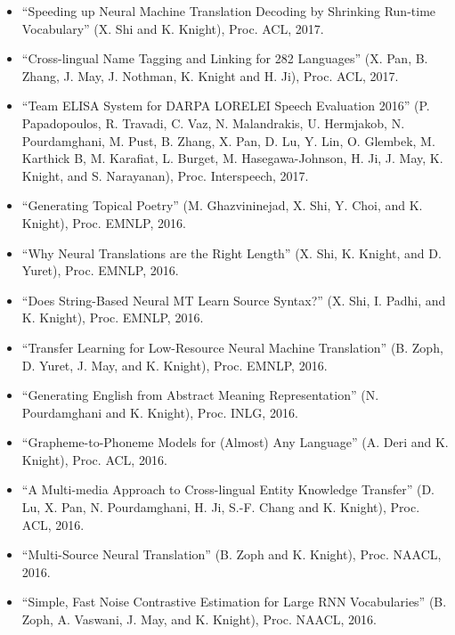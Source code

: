 \begin{itemize}
\item ``Speeding up Neural Machine Translation Decoding by Shrinking Run-time Vocabulary'' (X. Shi and K. Knight), Proc. ACL, 2017. 

\item ``Cross-lingual Name Tagging and Linking for 282 Languages'' (X. Pan, B. Zhang, J. May, J. Nothman, K. Knight and H. Ji), Proc. ACL, 2017. 

\item ``Team ELISA System for DARPA LORELEI Speech Evaluation 2016'' (P. Papadopoulos, R. Travadi, C. Vaz, N. Malandrakis, U. Hermjakob, N. Pourdamghani, M. Pust, B. Zhang, X. Pan, D. Lu, Y. Lin, O. Glembek, M. Karthick B, M. Karafiat, L. Burget, M. Hasegawa-Johnson, H. Ji, J. May, K. Knight, and S. Narayanan), Proc. Interspeech, 2017. 

\item ``Generating Topical Poetry'' (M. Ghazvininejad, X. Shi, Y. Choi, and K. Knight), Proc. EMNLP, 2016. 

\item ``Why Neural Translations are the Right Length'' (X. Shi, K. Knight, and D. Yuret), Proc. EMNLP, 2016. 

\item ``Does String-Based Neural MT Learn Source Syntax?'' (X. Shi, I. Padhi, and K. Knight), Proc. EMNLP, 2016. 

\item ``Transfer Learning for Low-Resource Neural Machine Translation'' (B. Zoph, D. Yuret, J. May, and K. Knight), Proc. EMNLP, 2016. 



\item ``Generating English from Abstract Meaning Representation'' (N. Pourdamghani and K. Knight), Proc. INLG, 2016. 

\item ``Grapheme-to-Phoneme Models for (Almost) Any Language'' (A. Deri and K. Knight), Proc. ACL, 2016. 

\item ``A Multi-media Approach to Cross-lingual Entity Knowledge Transfer'' (D. Lu, X. Pan, N. Pourdamghani, H. Ji, S.-F. Chang and K. Knight), Proc. ACL, 2016. 


\item ``Multi-Source Neural Translation'' (B. Zoph and K. Knight), Proc. NAACL, 2016. 

\item ``Simple, Fast Noise Contrastive Estimation for Large RNN Vocabularies'' (B. Zoph, A. Vaswani, J. May, and K. Knight), Proc. NAACL, 2016. 


\end{itemize}
